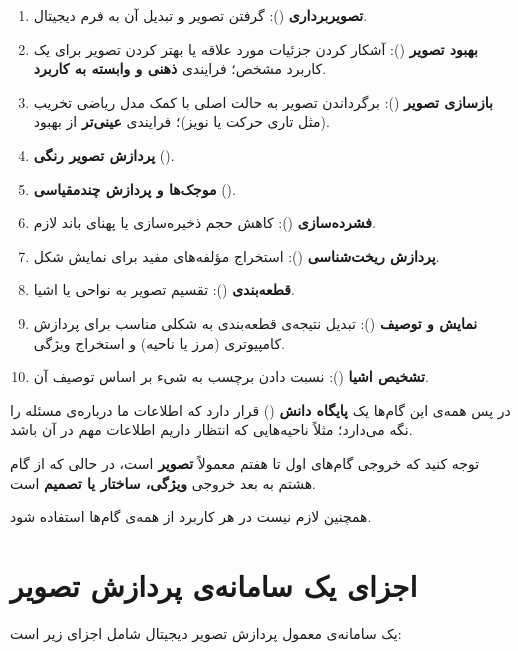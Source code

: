 \documentclass[11pt,a4paper]{article}
\begin{document}
	\begin{enumerate}
		\item \textbf{تصویربرداری} (): گرفتن تصویر و تبدیل آن به فرم دیجیتال.
		\item \textbf{بهبود تصویر} (): آشکار کردن جزئیات مورد علاقه
		یا بهتر کردن تصویر برای یک کاربرد مشخص؛ فرایندی \textbf{ذهنی و وابسته به کاربرد}.
		\item \textbf{بازسازی تصویر} (): برگرداندن تصویر به حالت اصلی با کمک مدل ریاضی
		تخریب (مثل تاری حرکت یا نویز)؛ فرایندی \textbf{عینی‌تر} از بهبود.
		\item \textbf{پردازش تصویر رنگی} ().
		\item \textbf{موجک‌ها و پردازش چندمقیاسی} ().
		\item \textbf{فشرده‌سازی} (): کاهش حجم ذخیره‌سازی یا پهنای باند لازم.
		\item \textbf{پردازش ریخت‌شناسی} (): استخراج مؤلفه‌های مفید
		برای نمایش شکل.
		\item \textbf{قطعه‌بندی} (): تقسیم تصویر به نواحی یا اشیا.
		\item \textbf{نمایش و توصیف} (): تبدیل نتیجه‌ی قطعه‌بندی
		به شکلی مناسب برای پردازش کامپیوتری (مرز یا ناحیه) و استخراج ویژگی.
		\item \textbf{تشخیص اشیا} (): نسبت دادن برچسب به شیء بر اساس توصیف آن.
	\end{enumerate}
	
	در پس همه‌ی این گام‌ها یک \textbf{پایگاه دانش} () قرار دارد
	که اطلاعات ما درباره‌ی مسئله را نگه می‌دارد؛ مثلاً ناحیه‌هایی که انتظار داریم اطلاعات مهم در آن باشد.
	
	توجه کنید که خروجی گام‌های اول تا هفتم معمولاً \textbf{تصویر} است، در حالی که از گام هشتم
	به بعد خروجی \textbf{ویژگی، ساختار یا تصمیم} است.
	
	همچنین لازم نیست در هر کاربرد از همه‌ی گام‌ها استفاده شود.
	
	
	\section{اجزای یک سامانه‌ی پردازش تصویر}
	
	یک سامانه‌ی معمول پردازش تصویر دیجیتال شامل اجزای زیر است:
	
\end{document}
